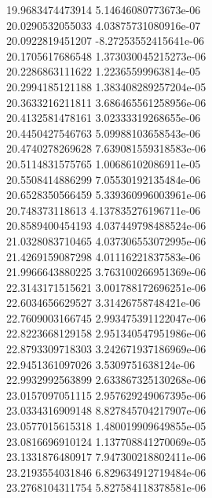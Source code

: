 {19.9683474473914 5.14646080773673e-06 \\
20.0290532055033 4.03875731080916e-07 \\
20.0922819451207 -8.27253552415641e-06 \\
20.1705617686548 1.373030045215273e-06 \\
20.2286863111622 1.22365599963814e-05 \\
20.2994185121188 1.383408289257204e-05 \\
20.3633216211811 3.686465561258956e-06 \\
20.4132581478161 3.02333319268655e-06 \\
20.4450427546763 5.09988103658543e-06 \\
20.4740278269628 7.639081559318583e-06 \\
20.5114831575765 1.00686102086911e-05 \\
20.5508414886299 7.05530192135484e-06 \\
20.6528350566459 5.339360996003961e-06 \\
20.748373118613 4.137835276196711e-06 \\
20.8589400454193 4.037449798488524e-06 \\
21.0328083710465 4.037306553072995e-06 \\
21.4269159087298 4.01116221837583e-06 \\
21.9966643880225 3.763100266951369e-06 \\
22.3143171515621 3.001788172696251e-06 \\
22.6034656629527 3.31426758748421e-06 \\
22.7609003166745 2.993475391122047e-06 \\
22.8223668129158 2.951340547951986e-06 \\
22.8793309718303 3.242671937186969e-06 \\
22.9451361097026 3.5309751638124e-06 \\
22.9932992563899 2.633867325130268e-06 \\
23.0157097051115 2.957629249067395e-06 \\
23.0334316909148 8.827845704217907e-06 \\
23.0577015615318 1.480019909649855e-05 \\
23.0816696910124 1.137708841270069e-05 \\
23.1331876480917 7.947300218802411e-06 \\
23.2193554031846 6.829634912719484e-06 \\
23.2768104311754 5.827584118378581e-06 \\
}
